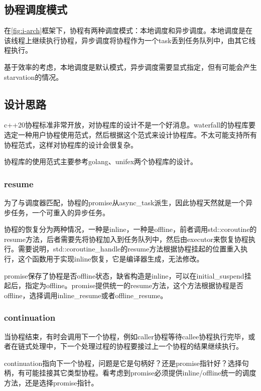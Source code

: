 \documentclass{article}
\begin{document}
\subsection{协程调度模式}

在\figurename\ref{fig:i-arch}框架下，协程有两种调度模式：本地调度和异步调度。本地调度是在该线程上继续执行协程，异步调度将协程作为一个task丢到任务队列中，由其它线程执行。

基于效率的考虑，本地调度是默认模式，异步调度需要显式指定，但有可能会产生starvation的情况。

\subsection{设计思路}

c++20协程标准非常开放，对协程库的设计不是一个好消息。waterfall的协程库要选定一种用户协程使用范式，然后根据这个范式来设计协程库。不太可能支持所有协程范式，这样对协程库的设计会很复杂。

协程库的使用范式主要参考golang、unifex两个协程库的设计。

\subsubsection{resume}

为了与调度器匹配，协程的promise从async\_task派生，因此协程天然就是一个异步任务，一个可重入的异步任务。

协程的恢复分为两种情况，一种是inline，一种是offline，前者调用std::coroutine的resume方法，后者需要先将协程加入到任务队列中，然后由executor来恢复协程执行。需要说明，std::coroutine\_handle的resume方法根据协程挂起的位置重入执行，这个函数用于实现inline恢复，它是编译器生成，无法修改。

promise保存了协程是否offline状态，缺省构造是inline，可以在initial\_suspend挂起后，指定为offline。promise提供统一的resume方法，这个方法根据协程是否offline，选择调用inline\_resume或者offline\_resume。

\subsubsection{continuation}

当协程结束，有时会调用下一个协程，例如caller协程等待callee协程执行完毕，或者在链式处理中，下一个处理过程的协程要接过上一个协程的结果继续执行。

continuation指向下一个协程，问题是它是句柄好？还是promise指针好？选择句柄，有可能挂接其它类型协程。看考虑到promise必须提供inline/offline统一的调度方法，还是选择promise指针。
\end{document}

